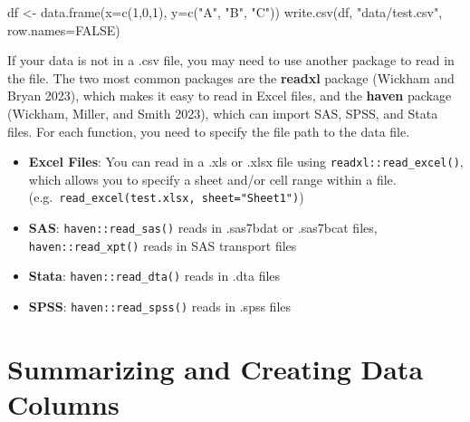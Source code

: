 \documentclass[
  letterpaper,
]{krantz}
\makeatletter
\newenvironment{Shaded}{\begin{snugshade}}{\end{snugshade}}
\newcommand{\AttributeTok}[1]{\textcolor[rgb]{0.40,0.45,0.13}{#1}}
\newcommand{\ConstantTok}[1]{\textcolor[rgb]{0.56,0.35,0.01}{#1}}
\newcommand{\DecValTok}[1]{\textcolor[rgb]{0.68,0.00,0.00}{#1}}
\newcommand{\FunctionTok}[1]{\textcolor[rgb]{0.28,0.35,0.67}{#1}}
\newcommand{\NormalTok}[1]{\textcolor[rgb]{0.00,0.23,0.31}{#1}}
\newcommand{\OtherTok}[1]{\textcolor[rgb]{0.00,0.23,0.31}{#1}}
\newcommand{\StringTok}[1]{\textcolor[rgb]{0.13,0.47,0.30}{#1}}
\newenvironment{kframe}{%
\medskip{}
\setlength{\fboxsep}{.8em}
 \def\at@end@of@kframe{}%
 \ifinner\ifhmode%
  \def\at@end@of@kframe{\end{minipage}}%
  \begin{minipage}{\columnwidth}%
 \fi\fi%
 \def\FrameCommand##1{\hskip\@totalleftmargin \hskip-\fboxsep
 \colorbox{shadecolor}{##1}\hskip-\fboxsep
     \hskip-\linewidth \hskip-\@totalleftmargin \hskip\columnwidth}%
 \MakeFramed {\advance\hsize-\width
   \@totalleftmargin\z@ \linewidth\hsize
   \@setminipage}}%
 {\par\unskip\endMakeFramed%
 \at@end@of@kframe}
\renewenvironment{Shaded}{\begin{kframe}}{\end{kframe}}
\makeatother
\begin{document}
\begin{Shaded}
\begin{Highlighting}[]
\NormalTok{df }\OtherTok{\textless{}{-}} \FunctionTok{data.frame}\NormalTok{(}\AttributeTok{x=}\FunctionTok{c}\NormalTok{(}\DecValTok{1}\NormalTok{,}\DecValTok{0}\NormalTok{,}\DecValTok{1}\NormalTok{), }\AttributeTok{y=}\FunctionTok{c}\NormalTok{(}\StringTok{"A"}\NormalTok{, }\StringTok{"B"}\NormalTok{, }\StringTok{"C"}\NormalTok{))}
\FunctionTok{write.csv}\NormalTok{(df, }\StringTok{"data/test.csv"}\NormalTok{, }\AttributeTok{row.names=}\ConstantTok{FALSE}\NormalTok{)}
\end{Highlighting}
\end{Shaded}

If your data is not in a .csv file, you may need to use another package
to read in the file. The two most common packages are the
\textbf{readxl} package (Wickham and Bryan 2023), which makes it easy to
read in Excel files, and the \textbf{haven} package (Wickham, Miller,
and Smith 2023), which can import SAS, SPSS, and Stata files. For each
function, you need to specify the file path to the data file.

\begin{itemize}
\item
  \textbf{Excel Files}: You can read in a .xls or .xlsx file using
  \texttt{readxl::read\_excel()}, which allows you to specify a sheet
  and/or cell range within a file.
  (e.g.~\texttt{read\_excel(\textquotesingle{}test.xlsx\textquotesingle{},\ sheet="Sheet1")})
\item
  \textbf{SAS}: \texttt{haven::read\_sas()} reads in .sas7bdat or
  .sas7bcat files, \texttt{haven::read\_xpt()} reads in SAS transport
  files
\item
  \textbf{Stata}: \texttt{haven::read\_dta()} reads in .dta files
\item
  \textbf{SPSS}: \texttt{haven::read\_spss()} reads in .spss files
\end{itemize}

\hypertarget{summarizing-and-creating-data-columns}{%
\section{Summarizing and Creating Data
Columns}\label{summarizing-and-creating-data-columns}}
\end{document}
